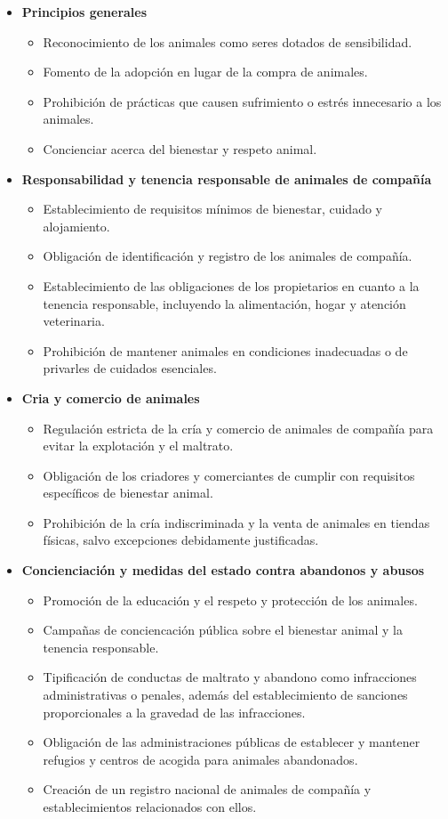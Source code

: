 \documentclass[a4paper, 12pt]{article}
\begin{document}
\begin{itemize}[noitemsep]
\item \textbf{Principios generales}
	\begin{itemize}[noitemsep]
	\item Reconocimiento de los animales como seres dotados de sensibilidad.
	\item Fomento de la adopción en lugar de la compra de animales.
	\item Prohibición de prácticas que causen sufrimiento o estrés innecesario a los animales.
	\item Concienciar acerca del bienestar y respeto animal.
	\end{itemize}
\item \textbf{Responsabilidad y tenencia responsable de animales de compañía}
	\begin{itemize}[noitemsep]
	\item Establecimiento de requisitos mínimos de bienestar, cuidado y alojamiento.
	\item Obligación de identificación y registro de los animales de compañía.
	\item Establecimiento de las obligaciones de los propietarios en cuanto a la tenencia responsable, incluyendo la alimentación, hogar y atención veterinaria.
	\item Prohibición de mantener animales en condiciones inadecuadas o de privarles de cuidados esenciales.
	\end{itemize}
\item \textbf{Cria y comercio de animales}
	\begin{itemize}[noitemsep]
	\item Regulación estricta de la cría y comercio de animales de compañía para evitar la explotación y el maltrato.
	\item Obligación de los criadores y comerciantes de cumplir con requisitos específicos de bienestar animal.
	\item Prohibición de la cría indiscriminada y la venta de animales en tiendas físicas, salvo excepciones debidamente justificadas.
	\end{itemize}
\item \textbf{Concienciación y medidas del estado contra abandonos y abusos}
	\begin{itemize}[noitemsep]
	\item Promoción de la educación y el respeto y protección de los animales.
	\item Campañas de conciencación pública sobre el bienestar animal y la tenencia responsable.
	\item Tipificación de conductas de maltrato y abandono como infracciones administrativas o penales, además del establecimiento de sanciones proporcionales a la gravedad de las infracciones.
	\item Obligación de las administraciones públicas de establecer y mantener refugios y centros de acogida para animales abandonados.
	\item Creación de un registro nacional de animales de compañía y establecimientos relacionados con ellos.
	\end{itemize}
\end{itemize}
\end{document}
